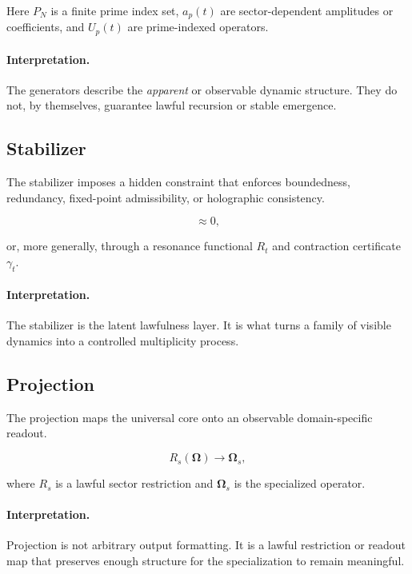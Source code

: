 \documentclass[11pt]{article}
\theoremstyle{plain}
\theoremstyle{definition}
\theoremstyle{remark}
\newcommand{\Om}{\boldsymbol{\Omega}}
\begin{document}
Here \(P_N\) is a finite prime index set, \(a_p(t)\) are sector-dependent amplitudes or coefficients, and \(U_p(t)\) are prime-indexed operators.

\paragraph{Interpretation.}
The generators describe the \emph{apparent} or observable dynamic structure. They do not, by themselves, guarantee lawful recursion or stable emergence.

\subsection{Stabilizer}

The stabilizer imposes a hidden constraint that enforces boundedness, redundancy, fixed-point admissibility, or holographic consistency.

\begin{equation}
[\Om, P] \approx 0,
\label{eq:stabilizer-commutator}
\end{equation}

or, more generally, through a resonance functional \(R_t\) and contraction certificate \(\gamma_t\).

\paragraph{Interpretation.}
The stabilizer is the latent lawfulness layer. It is what turns a family of visible dynamics into a controlled multiplicity process.

\subsection{Projection}

The projection maps the universal core onto an observable domain-specific readout.

\begin{equation}
R_s(\Om) \longrightarrow \Om_s,
\label{eq:projection}
\end{equation}

where \(R_s\) is a lawful sector restriction and \(\Om_s\) is the specialized operator.

\paragraph{Interpretation.}
Projection is not arbitrary output formatting. It is a lawful restriction or readout map that preserves enough structure for the specialization to remain meaningful.
\end{document}

